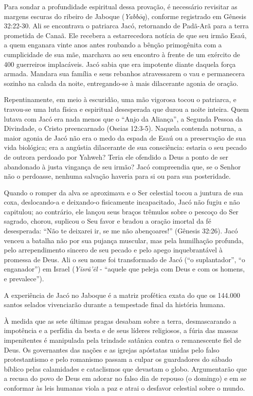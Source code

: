 Para sondar a profundidade espiritual dessa provação, é necessário revisitar as margens escuras do ribeiro de Jaboque (\textit{Yabbōq}), conforme registrado em Gênesis 32:22-30. Ali se encontrava o patriarca Jacó, retornando de Padã-Arã para a terra prometida de Canaã. Ele recebera a estarrecedora notícia de que seu irmão Esaú, a quem enganara vinte anos antes roubando a bênção primogênita com a cumplicidade de sua mãe, marchava ao seu encontro à frente de um exército de 400 guerreiros implacáveis. Jacó sabia que era impotente diante daquela força armada. Mandara sua família e seus rebanhos atravessarem o vau e permanecera sozinho na calada da noite, entregando-se à mais dilacerante agonia de oração.

Repentinamente, em meio à escuridão, uma mão vigorosa tocou o patriarca, e travou-se uma luta física e espiritual desesperada que durou a noite inteira. Quem lutava com Jacó era nada menos que o ``Anjo da Aliança'', a Segunda Pessoa da Divindade, o Cristo preencarnado (Oseias 12:3-5). Naquela contenda noturna, a maior agonia de Jacó não era o medo da espada de Esaú ou a preservação de sua vida biológica; era a angústia dilacerante de sua consciência: estaria o seu pecado de outrora perdoado por Yahweh? Teria ele ofendido a Deus a ponto de ser abandonado à justa vingança de seu irmão? Jacó compreendia que, se o Senhor não o perdoasse, nenhuma salvação haveria para si ou para sua posteridade.

Quando o romper da alva se aproximava e o Ser celestial tocou a juntura de sua coxa, deslocando-a e deixando-o fisicamente incapacitado, Jacó não fugiu e não capitulou; ao contrário, ele lançou seus braços trêmulos sobre o pescoço do Ser sagrado, chorou, suplicou o Seu favor e bradou a oração imortal da fé desesperada: ``Não te deixarei ir, se me não abençoares!'' (Gênesis 32:26). Jacó venceu a batalha não por sua pujança muscular, mas pela humilhação profunda, pelo arrependimento sincero de seu pecado e pelo apego inquebrantável à promessa de Deus. Ali o seu nome foi transformado de Jacó (``o suplantador'', ``o enganador'') em Israel (\textit{Yisrā’ēl} - ``aquele que peleja com Deus e com os homens, e prevalece'').

A experiência de Jacó no Jaboque é a matriz profética exata do que os 144.000 santos selados vivenciarão durante a tempestade final da história humana.

À medida que as sete últimas pragas desabam sobre a terra, desmascarando a impotência e a perfídia da besta e de seus líderes religiosos, a fúria das massas impenitentes é manipulada pela trindade satânica contra o remanescente fiel de Deus. Os governantes das nações e as igrejas apóstatas unidas pelo falso protestantismo e pelo romanismo passam a culpar os guardadores do sábado bíblico pelas calamidades e cataclismos que devastam o globo. Argumentarão que a recusa do povo de Deus em adorar no falso dia de repouso (o domingo) e em se conformar às leis humanas viola a paz e atrai o desfavor celestial sobre o mundo.


